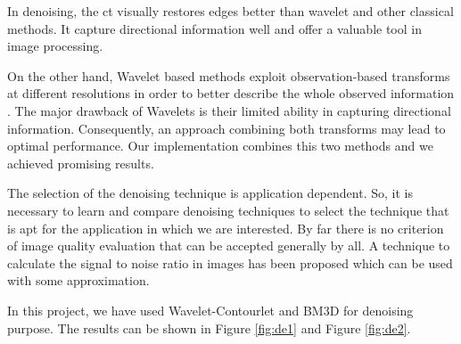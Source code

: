 In denoising, the \gls{ct} visually restores edges better than wavelet and other classical methods. It capture directional information well and offer a valuable tool in image processing. 

On the other hand, Wavelet based methods exploit observation-based transforms at different resolutions in order to better describe the whole observed information . The major drawback of Wavelets is their limited ability in capturing directional information. Consequently, an approach combining both transforms may lead to optimal performance. Our implementation combines this two methods and we achieved promising results.


The selection of the denoising technique is application dependent. So, it is necessary
to learn and compare denoising techniques to select the technique that is apt for the
application in which we are interested. By far there is no criterion of image quality evaluation that can be accepted generally
by all. A technique to calculate the signal to noise ratio in images has been proposed
which can be used with some approximation.

In this project, we have used Wavelet-Contourlet and BM3D for denoising purpose. The results can be shown in Figure \ref{fig:de1} and Figure \ref{fig:de2}. 




